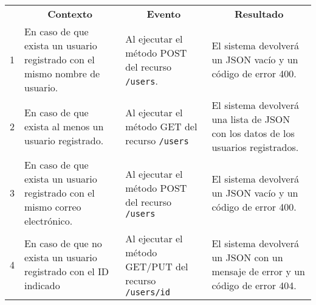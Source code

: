 \begin{center}
\begin{longtable}{|m{0.5cm}|m{4cm}|m{4cm}|m{4.5cm}|}
\hline \rowcolor[gray]{0.9}
	\multicolumn{4}{|c|}{\textbf{Criterios de aceptación}} \\
    \hline  \rowcolor[gray]{0.9}
        \multicolumn{1}{|c|}{\textbf{ID}} &
        \multicolumn{1}{c|}{\textbf{Contexto}} &
        \multicolumn{1}{c|}{\textbf{Evento}} &
        \multicolumn{1}{c|}{\textbf{Resultado}} \\
    \hline
    \endhead
1&En caso de que exista un usuario registrado con el mismo nombre de usuario. & Al ejecutar el método POST del recurso \texttt{/users}.  & El sistema devolverá un JSON vacío y un código de error 400. \\ \hline
	\hline
2&En caso de que exista al menos un usuario registrado. & Al ejecutar el método GET del recurso \texttt{/users}  & El sistema devolverá una lista de JSON con los datos de los usuarios registrados. \\ 		\hline
	\hline
3&En caso de que exista un usuario registrado con el mismo correo electrónico. & Al ejecutar el método POST del recurso \texttt{/users}  & El sistema devolverá un JSON vacío y un código de error 400. \\ \hline
    \hline
4&En caso de que no exista un usuario registrado con el ID indicado & Al ejecutar el método GET/PUT del recurso \texttt{/users/id}  & El sistema devolverá un JSON con un mensaje de error y un código de error 404. \\ \hline

  \end{longtable}
\end{center}

\begin{comment}
	Cuando devolvería 401 el recurso del token.
\end{comment}



